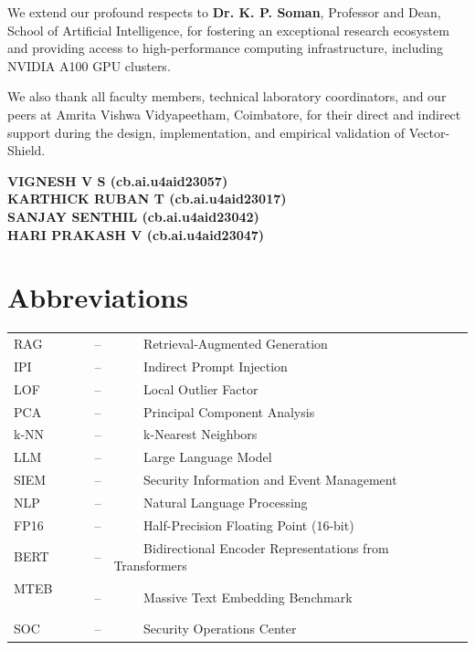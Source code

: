 \documentclass[a4paper, 12pt]{report}
\theoremstyle{definition}
\begin{document}
	We extend our profound respects to \textbf{Dr. K. P. Soman}, Professor and Dean, School of Artificial Intelligence, for fostering an exceptional research ecosystem and providing access to high-performance computing infrastructure, including NVIDIA A100 GPU clusters.
	
	We also thank all faculty members, technical laboratory coordinators, and our peers at Amrita Vishwa Vidyapeetham, Coimbatore, for their direct and indirect support during the design, implementation, and empirical validation of Vector-Shield.
	\vspace{1cm}
	\begin{flushright}
		\textbf{VIGNESH V S (cb.ai.u4aid23057)}\\
		\textbf{KARTHICK RUBAN T (cb.ai.u4aid23017)}\\
		\textbf{SANJAY SENTHIL (cb.ai.u4aid23042)}\\
		\textbf{HARI PRAKASH V (cb.ai.u4aid23047)}
	\end{flushright}

	\listoffigures
	\listoftables
	\newpage

\section*{{\huge Abbreviations}\hfill} 
\vspace{1.2cm}
\begin{tabular}{lll}
RAG ~~~~&--&~~~~ Retrieval-Augmented Generation \\
IPI ~~~~&--&~~~~ Indirect Prompt Injection \\
LOF ~~~~&--&~~~~ Local Outlier Factor \\
PCA ~~~~&--&~~~~ Principal Component Analysis \\
k-NN ~~~~&--&~~~~ k-Nearest Neighbors \\
LLM ~~~~&--&~~~~ Large Language Model \\
SIEM ~~~~&--&~~~~ Security Information and Event Management \\
NLP ~~~~&--&~~~~ Natural Language Processing \\
FP16 ~~~~&--&~~~~ Half-Precision Floating Point (16-bit) \\
BERT ~~~~&--&~~~~ Bidirectional Encoder Representations from Transformers \\
MTEB ~~~~&--&~~~~ Massive Text Embedding Benchmark \\
SOC ~~~~&--&~~~~ Security Operations Center \\
\end{tabular}	
\newpage
\end{document}
